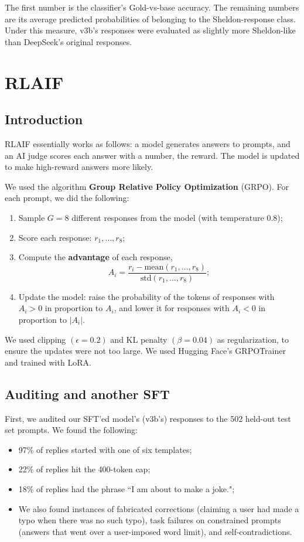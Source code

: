 \documentclass[9pt]{extarticle}
\begin{document}
The first number is the classifier's Gold-vs-base accuracy. The remaining numbers are its average predicted probabilities of belonging to the Sheldon-response class. Under this measure, v3b's responses were evaluated as slightly more Sheldon-like than DeepSeek's original responses.

\section{RLAIF}

\subsection{Introduction}

RLAIF essentially works as follows: a model generates answers to prompts, and an AI judge scores each answer with a number, the reward. The model is updated to make high-reward answers more likely.

We used the algorithm \textbf{Group Relative Policy Optimization} (GRPO). For each prompt, we did the following:
\begin{enumerate}
    \item Sample $G = 8$ different responses from the model (with temperature $0.8$);
    \item Score each response: $r_1, \ldots , r_8$;
    \item Compute the \textbf{advantage} of each response, 
    $$A_i = \frac{r_i - \text{mean}(r_1, \ldots , r_8)}{\text{std}(r_1, \ldots , r_8)};$$
    \item Update the model: raise the probability of the tokens of responses with $A_i > 0$ in proportion to $A_i$, and lower it for responses with $A_i < 0$ in proportion to $|A_i|$.
\end{enumerate}

We used clipping $(\epsilon = 0.2)$ and KL penalty $(\beta = 0.04)$ as regularization, to ensure the updates were not too large. We used Hugging Face's GRPOTrainer and trained with LoRA.

\subsection{Auditing and another SFT}

First, we audited our SFT'ed model's (v3b's) responses to the 502 held-out test set prompts. We found the following:
\begin{itemize}
    \item 97\% of replies started with one of six templates;
    \item 22\% of replies hit the 400-token cap;
    \item 18\% of replies had the phrase ``I am about to make a joke.";
    \item We also found instances of fabricated corrections (claiming a user had made a typo when there was no such typo), task failures on constrained prompts (answers that went over a user-imposed word limit), and self-contradictions.
\end{itemize}
\end{document}
